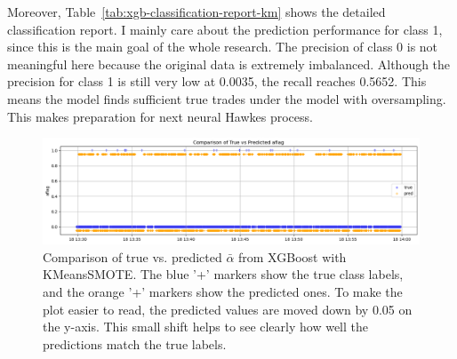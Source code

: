 Moreover, Table~\ref{tab:xgb-classification-report-km} shows the detailed classification report. I mainly care about the prediction performance for class 1, since this is the main goal of the whole research. The precision of class 0 is not meaningful here because the original data is extremely imbalanced. Although the precision for class 1 is still very low at 0.0035, the recall reaches 0.5652. This means the model finds sufficient true trades under the model with oversampling. This makes preparation for next neural Hawkes process.


\begin{figure}[H]
    \centering
    \includegraphics[width=\textwidth]{figures/aflag_XGBoost_181330.png}
    \caption{Comparison of true vs. predicted $\bar{\alpha}$ from XGBoost with KMeansSMOTE. 
    The blue '+' markers show the true class labels, and the orange '+' markers show the predicted ones. To make the plot easier to read, the predicted values are moved down by 0.05 on the y-axis. This small shift helps to see clearly how well the predictions match the true labels.
    }
    \label{fig:xgb-pred-vs-true-km}
\end{figure}

